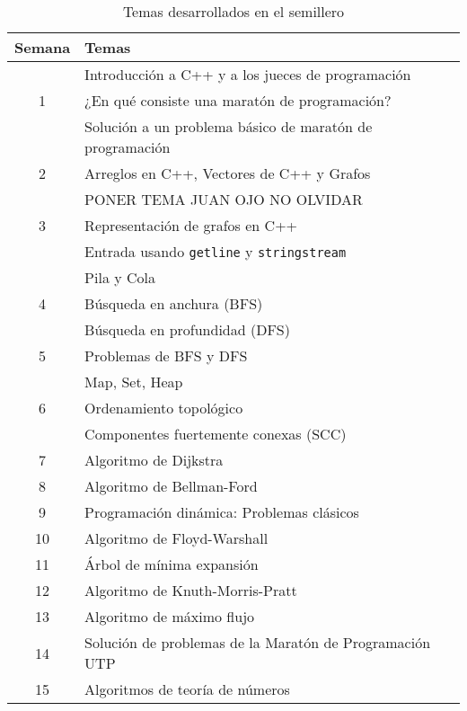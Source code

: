\documentclass[conference]{IEEEtran}
\begin{document}
\begin{table}
	\centering
	\begin{tabular}{|c|l|}
		\hline
		Semana & Temas\\
		\hline \hline
		  & Introducción a C++ y a los jueces de programación \\
		1 & ¿En qué consiste una maratón de programación?\\
		  & Solución a un problema básico de maratón de programación\\
		\hline
		2 & Arreglos en C++, Vectores de C++ y Grafos\\
		\hline
		  & {\color{red}PONER TEMA JUAN OJO NO OLVIDAR} \\
		3 & Representación de grafos en C++\\
		  & Entrada usando \verb|getline| y \verb|stringstream|\\
		\hline
		  & Pila y Cola\\
		4 & Búsqueda en anchura (BFS)\\
		  & Búsqueda en profundidad (DFS)\\
		\hline
		5 & Problemas de BFS y DFS\\
		\hline
		  & Map, Set, Heap\\
		6 & Ordenamiento topológico\\
		  & Componentes fuertemente conexas (SCC)\\
		\hline
		7 & Algoritmo de Dijkstra \\
		\hline 
		8 & Algoritmo de Bellman-Ford\\
		\hline 
		9 & Programación dinámica: Problemas clásicos\\
		\hline
		10 & Algoritmo de Floyd-Warshall\\
		\hline
		11 & Árbol de mínima expansión\\
		\hline
		12 & Algoritmo de Knuth-Morris-Pratt\\
		\hline
		13 & Algoritmo de máximo flujo\\
		\hline
		14 & Solución de problemas de la Maratón de Programación UTP\\
		\hline
		15 & Algoritmos de teoría de números\\
		\hline 
	\end{tabular}
	
	\quad \\
	\caption{Temas desarrollados en el semillero}
	\label{Tabla:temas}
\end{table}
\end{document}
